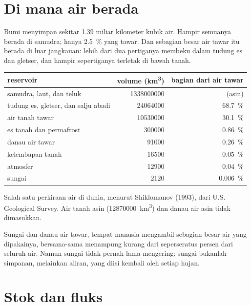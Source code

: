 \section{Di mana air berada}

Bumi menyimpan sekitar 1.39 miliar kilometer kubik air. Hampir semuanya
berada di samudra; hanya \qty{2.5}{\percent} yang tawar. Dan sebagian besar air
tawar itu berada di luar jangkauan: lebih dari dua pertiganya membeku dalam
tudung es dan gletser, dan hampir sepertiganya terletak di bawah tanah.

\begin{center}
\small
\begin{tabular}{|l|r|r|}
\hline
\textbf{reservoir} & \textbf{volume (\unit{km^3})} & \textbf{bagian dari air tawar} \\ \hline
samudra, laut, dan teluk & \num{1338000000} & (asin) \\ \hline
tudung es, gletser, dan salju abadi & \num{24064000} & \qty{68.7}{\percent} \\ \hline
air tanah tawar & \num{10530000} & \qty{30.1}{\percent} \\ \hline
es tanah dan permafrost & \num{300000} & \qty{0.86}{\percent} \\ \hline
danau air tawar & \num{91000} & \qty{0.26}{\percent} \\ \hline
kelembapan tanah & \num{16500} & \qty{0.05}{\percent} \\ \hline
atmosfer & \num{12900} & \qty{0.04}{\percent} \\ \hline
sungai & \num{2120} & \qty{0.006}{\percent} \\ \hline
\end{tabular}

{\small Salah satu perkiraan air di dunia, menurut Shiklomanov (1993), dari
U.S. Geological Survey. Air tanah asin (\num{12870000}~\unit{km^3}) dan danau
air asin tidak dimasukkan.}
\end{center}

Sungai dan danau air tawar, tempat manusia mengambil sebagian besar air yang
dipakainya, bersama-sama menampung kurang dari seperseratus persen dari
seluruh air. Namun sungai tidak pernah lama mengering: sungai bukanlah
simpanan, melainkan aliran, yang diisi kembali oleh setiap hujan.

\section{Stok dan fluks}

